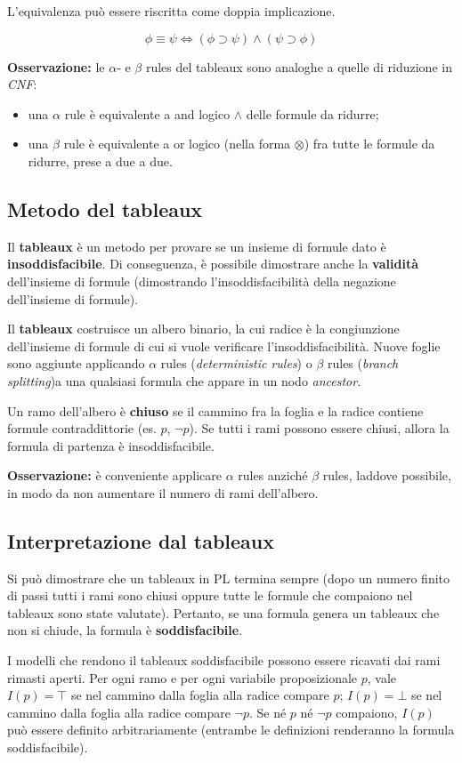 L'equivalenza può essere riscritta come doppia implicazione.

$$\phi \equiv \psi \iff (\phi \supset \psi) \land (\psi \supset \phi)$$

\noindent\hrulefill
\vspace{1em}

\textbf{Osservazione:} le $\alpha$- e $\beta$ rules del tableaux sono analoghe a quelle di riduzione in \textit{CNF}:
\begin{itemize}
\item una $\alpha$ rule è equivalente a and logico $\land$ delle formule da ridurre;
\item una $\beta$ rule è equivalente a or logico (nella forma $\otimes$) fra tutte le formule da ridurre, prese a due a due.
\end{itemize}

\subsection{Metodo del tableaux}
Il \textbf{tableaux} è un metodo per provare se un insieme di formule dato è \textbf{insoddisfacibile}. Di conseguenza, è possibile dimostrare anche la \textbf{validità} dell'insieme di formule (dimostrando l'insoddisfacibilità della negazione dell'insieme di formule).

Il \textbf{tableaux} costruisce un albero binario, la cui radice è la congiunzione dell'insieme di formule di cui si vuole verificare l'insoddisfacibilità. Nuove foglie sono aggiunte applicando $\alpha$ rules (\textit{deterministic rules}) o $\beta$ rules (\textit{branch splitting})a una qualsiasi formula che appare in un nodo \textit{ancestor}. 

Un ramo dell'albero è \textbf{chiuso} se il cammino fra la foglia e la radice contiene formule contraddittorie (es. $p$, $\lnot p$). Se tutti i rami possono essere chiusi, allora la formula di partenza è insoddisfacibile.

\textbf{Osservazione:} è conveniente applicare $\alpha$ rules anziché $\beta$ rules, laddove possibile, in modo da non aumentare il numero di rami dell'albero.

\subsection{Interpretazione dal tableaux}
Si può dimostrare che un tableaux in PL termina sempre (dopo un numero finito di passi tutti i rami sono chiusi oppure tutte le formule che compaiono nel tableaux sono state valutate). Pertanto, se una formula genera un tableaux che non si chiude, la formula è \textbf{soddisfacibile}.

I modelli che rendono il tableaux soddisfacibile possono essere ricavati dai rami rimasti aperti. Per ogni ramo e per ogni variabile proposizionale $p$, vale $I(p) = \top$ se nel cammino dalla foglia alla radice compare $p$; $I(p) = \bot$ se nel cammino dalla foglia alla radice compare $\lnot p$. Se né $p$ né $\lnot p$ compaiono, $I(p)$ può essere definito arbitrariamente (entrambe le definizioni renderanno la formula soddisfacibile).